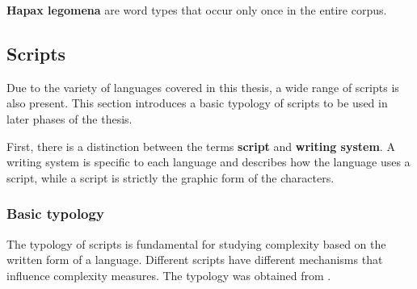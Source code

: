 \textbf{Hapax legomena} are word types that occur only once in the entire corpus.

\newpage

\subsection{Scripts}
\label{sec:scripts}

Due to the variety of languages covered in this thesis, a wide range of scripts is also present. This section introduces a basic typology of scripts to be used in later phases of the thesis.

First, there is a distinction between the terms \textbf{script} and \textbf{writing system}. A writing system is specific to each language and describes how the language uses a script, while a script is strictly the graphic form of the characters. \parencite{coulmas2003writing}


\subsubsection{Basic typology}

The typology of scripts is fundamental for studying complexity based on the written form of a language. Different scripts have different mechanisms that influence complexity measures. The typology was obtained from \textcite{coulmas2003writing}.

